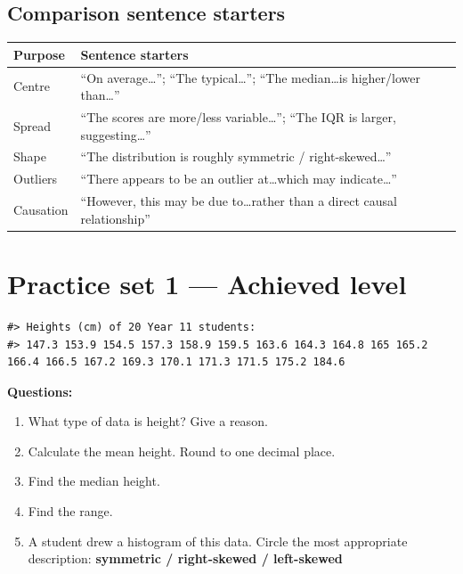 \documentclass[
  11pt,
  a4paper,
  oneside,
  open=any]{scrbook}
\providecommand{\tightlist}{%
  \setlength{\itemsep}{0pt}\setlength{\parskip}{0pt}}
\begin{document}
\subsection{Comparison sentence
starters}\label{comparison-sentence-starters}

\begin{longtable}[]{@{}
  >{\raggedright\arraybackslash}p{}
  >{\raggedright\arraybackslash}p{}@{}}
\toprule\noalign{}
\begin{minipage}[b]{\linewidth}\raggedright
Purpose
\end{minipage} & \begin{minipage}[b]{\linewidth}\raggedright
Sentence starters
\end{minipage} \\
\midrule\noalign{}
\endhead
\bottomrule\noalign{}
\endlastfoot
Centre & ``On average\ldots{}''; ``The typical\ldots{}''; ``The
median\ldots is higher/lower than\ldots{}'' \\
Spread & ``The scores are more/less variable\ldots{}''; ``The IQR is
larger, suggesting\ldots{}'' \\
Shape & ``The distribution is roughly symmetric /
right-skewed\ldots{}'' \\
Outliers & ``There appears to be an outlier at\ldots which may
indicate\ldots{}'' \\
Causation & ``However, this may be due to\ldots rather than a direct
causal relationship'' \\
\end{longtable}

\section{Practice set 1 --- Achieved
level}\label{practice-set-1-achieved-level}

\begin{verbatim}
#> Heights (cm) of 20 Year 11 students:
#> 147.3 153.9 154.5 157.3 158.9 159.5 163.6 164.3 164.8 165 165.2 166.4 166.5 167.2 169.3 170.1 171.3 171.5 175.2 184.6
\end{verbatim}

\textbf{Questions:}

\begin{enumerate}
\def\labelenumi{\arabic{enumi}.}
\tightlist
\item
  What type of data is height? Give a reason.
\item
  Calculate the mean height. Round to one decimal place.
\item
  Find the median height.
\item
  Find the range.
\item
  A student drew a histogram of this data. Circle the most appropriate
  description: \textbf{symmetric / right-skewed / left-skewed}
\end{enumerate}
\end{document}

